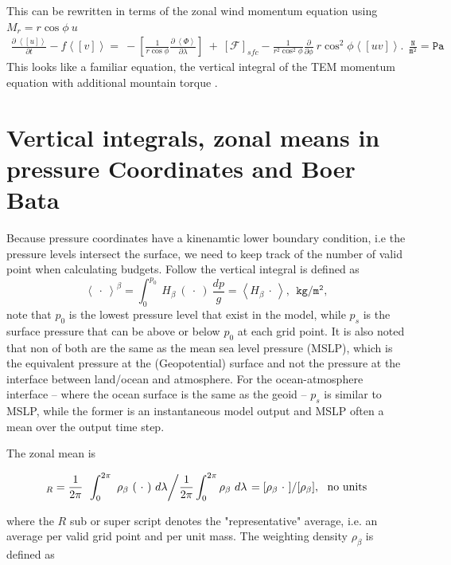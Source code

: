 \documentclass[11pt]{article}
\numberwithin{equation}{section}
\newcommand{\beq}{\begin{equation}}
\newcommand{\eeq}{\end{equation}}
\newcommand{\la}{\langle}
\newcommand{\ra}{\rangle}
\newcommand{\lara}[1]{\left\la{#1}\right\ra}
\newcommand{\cphi}{\cos \phi}
\newcommand{\rb}{\rho_\beta}
\begin{document}
This can be rewritten in terms of the zonal wind momentum equation using $M_r = r \cphi ~u$
\begin{align} \label{eq:balance}
\frac{\partial ~\lara{[u]}}{\partial t}  - f \lara{ [v]}    = ~ - \left[\frac{1}{r \cphi} \frac{\partial~\lara{\Phi}}{\partial \lambda}  \right]    ~+~ [\mathcal{F}]_{sfc}  - \frac{1}{r^2 \cos^2{\phi}}  \frac{\partial}{\partial \phi}  ~ r \cos^2{\phi} \lara{ [u v] }.  ~~\mathtt{\frac{N}{m^2}=Pa}
\end{align}
This looks like a familiar equation, the vertical integral of the TEM momentum equation with additional mountain torque \citep{Andrews1976,Edmon1980}.



\section{Vertical integrals, zonal means in pressure Coordinates and Boer Bata}
Because pressure coordinates have a kinenamtic lower boundary condition, i.e the pressure levels intersect the surface, we need to keep track of the number of valid point when calculating budgets. Follow \citet{Boer1982,Wills2015} the vertical integral is defined as
\beq \label{beta_int}
\lara {~\cdot~}^\beta = \int_0^{p_0} ~H_\beta~(~\cdot~) ~ \frac{d p}{g} = \lara{H_\beta~\cdot~}, ~~\mathtt{kg /m^2},  
\eeq
note that $p_0$ is the lowest pressure level that exist in the model, while $p_s$ is the surface pressure that can be above or below $p_0$ at each grid point. It is also noted that non of both are the same as the mean sea level pressure (MSLP), which is the equivalent pressure at the (Geopotential) surface and not the pressure at the interface between land/ocean and atmosphere. For the ocean-atmosphere interface -- where the ocean surface is the same as the geoid -- $p_s$ is similar to MSLP, while the former is an instantaneous model output and MSLP often a mean over the output time step.\par
The zonal mean is

\beq
[~\cdot~]_R =  \frac{1}{2 \pi} \left. ~ \int_0^ {2 \pi} ~ \rb ~ (~\cdot~) ~ d\lambda \middle/ 
\frac{1}{2 \pi}  \int_0^{2 \pi} \rb ~ d \lambda \right.  = [\rb~\cdot~]/  [\rb] ,~~ \mathtt{\text{no units}}
\eeq


where the $R$ sub or super script denotes the "representative" average, i.e. an average per valid grid point and per unit mass.
The weighting density $\rb$ is defined as 
\end{document}

